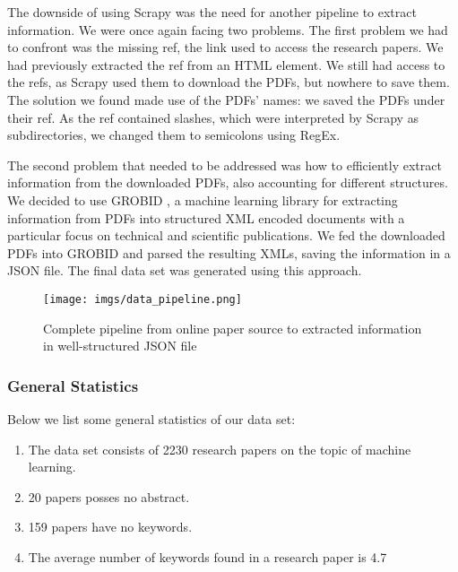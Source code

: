 The downside of using Scrapy \cite{kouzis2016learning} was the need for another pipeline to extract information. We were once again facing two problems. The first problem we had to confront was the missing ref, the link used to access the research papers. We had previously extracted the ref from an HTML element. We still had access to the refs, as Scrapy  \cite{kouzis2016learning}used them to download the PDFs, but nowhere to save them. The solution we found made use of the PDFs' names: we saved the PDFs under their ref. As the ref contained slashes, which were interpreted by Scrapy \cite{kouzis2016learning} as subdirectories, we changed them to semicolons using RegEx.


The second problem that needed to be addressed was how to efficiently extract information from the downloaded PDFs, also accounting for different structures. We decided to use GROBID \cite{GROBID}, a machine learning library for extracting information from PDFs into structured XML encoded documents with a particular focus on technical and scientific publications. We fed the downloaded PDFs into GROBID  \cite{GROBID} and parsed the resulting XMLs, saving the information in a JSON file. The final data set was generated using this approach.


\begin{figure}[h]
    \centering
    \texttt{[image: imgs/data\_pipeline.png]}
    \caption{Complete pipeline from online paper source to extracted information in well-structured JSON file}
    \label{fig:data pipeline}
\end{figure}

\subsubsection{General Statistics}
\subsubcomment{}
Below we list some general statistics of our data set:
\begin{enumerate}
	\item The data set consists of 2230 research papers on the topic of machine learning.
	\item 20 papers posses no abstract.
	\item 159 papers have no keywords.
	\item The average number of keywords found in a research paper is 4.7
\end{enumerate}

